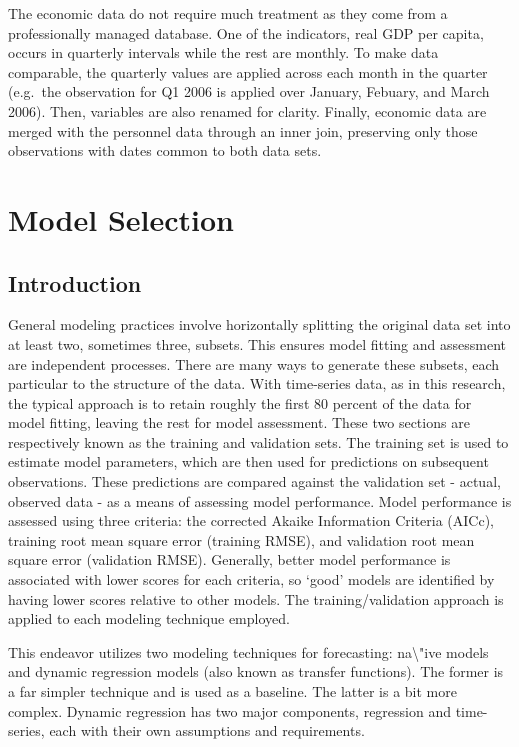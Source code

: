 \documentclass[12pt,letterpaper,toc=flat,oneside]{report}
\theoremstyle{definition}
\theoremstyle{definition}
\theoremstyle{definition}
\theoremstyle{remark}
\begin{document}
The economic data do not require much treatment as they come from a
professionally managed database. One of the indicators, real GDP per
capita, occurs in quarterly intervals while the rest are monthly. To
make data comparable, the quarterly values are applied across each month
in the quarter (e.g.~the observation for Q1 2006 is applied over
January, Febuary, and March 2006). Then, variables are also renamed for
clarity. Finally, economic data are merged with the personnel data
through an inner join, preserving only those observations with dates
common to both data sets.

\hypertarget{model-selection}{%
\section{Model Selection}\label{model-selection}}

\hypertarget{introduction-2}{%
\subsection{Introduction}\label{introduction-2}}

General modeling practices involve horizontally splitting the original
data set into at least two, sometimes three, subsets. This ensures model
fitting and assessment are independent processes. There are many ways to
generate these subsets, each particular to the structure of the data.
With time-series data, as in this research, the typical approach is to
retain roughly the first 80 percent of the data for model fitting,
leaving the rest for model assessment. These two sections are
respectively known as the training and validation sets. The training set
is used to estimate model parameters, which are then used for
predictions on subsequent observations. These predictions are compared
against the validation set - actual, observed data - as a means of
assessing model performance. Model performance is assessed using three
criteria: the corrected Akaike Information Criteria (AICc), training
root mean square error (training RMSE), and validation root mean square
error (validation RMSE). Generally, better model performance is
associated with lower scores for each criteria, so `good' models are
identified by having lower scores relative to other models. The
training/validation approach is applied to each modeling technique
employed.

This endeavor utilizes two modeling techniques for forecasting:
na\textbackslash{}"ive models and dynamic regression models (also known
as transfer functions). The former is a far simpler technique and is
used as a baseline. The latter is a bit more complex. Dynamic regression
has two major components, regression and time-series, each with their
own assumptions and requirements.
\end{document}
